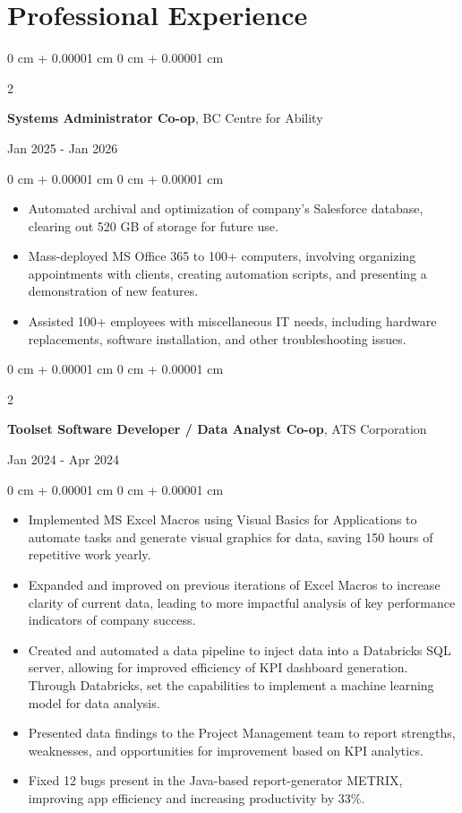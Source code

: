 \documentclass[10pt, letterpaper]{article}
\newenvironment{highlights}{
    \begin{itemize}[
        topsep=0.10 cm,
        parsep=0.10 cm,
        partopsep=0pt,
        itemsep=0pt,
        leftmargin=0 cm + 10pt
    ]
}{
    \end{itemize}
} %
\newenvironment{onecolentry}{
    \begin{adjustwidth}{
        0 cm + 0.00001 cm
    }{
        0 cm + 0.00001 cm
    }
}{
    \end{adjustwidth}
} %
\newenvironment{twocolentry}[2][]{
    \onecolentry
    \def\secondColumn{#2}
    \setcolumnwidth{\fill, 4.5 cm}
    \begin{paracol}{2}
}{
    \switchcolumn \raggedleft \secondColumn
    \end{paracol}
    \endonecolentry
} %
\begin{document}
    \section{Professional Experience}
    \begin{twocolentry}{Jan 2025 - Jan 2026}
        \textbf{Systems Administrator Co-op}, BC Centre for Ability
    \end{twocolentry}
    \vspace{0.10 cm}
    \begin{onecolentry}
        \begin{highlights}
            \item Automated archival and optimization of company's Salesforce database, clearing out 520 GB of storage for future use.
            \item Mass-deployed MS Office 365 to 100+ computers, involving organizing appointments with clients, creating automation scripts, and presenting a demonstration of new features.
            \item Assisted 100+ employees with miscellaneous IT needs, including hardware replacements, software installation, and other troubleshooting issues. 
        \end{highlights}
    \end{onecolentry}
    \vspace{0.2 cm}
    \begin{twocolentry}{Jan 2024 - Apr 2024}
        \textbf{Toolset Software Developer / Data Analyst Co-op}, ATS Corporation
    \end{twocolentry}
    \vspace{0.10 cm}
    \begin{onecolentry}
        \begin{highlights}
            \item Implemented MS Excel Macros using Visual Basics for Applications to automate tasks and generate visual graphics for data, saving 150 hours of repetitive work yearly.
            \item Expanded and improved on previous iterations of Excel Macros to increase clarity of current data, leading to more impactful analysis of key performance indicators of company success.
            \item Created and automated a data pipeline to inject data into a Databricks SQL server, allowing for improved efficiency of KPI dashboard generation. Through Databricks, set the capabilities to implement a machine learning model for data analysis.
            \item Presented data findings to the Project Management team to report strengths, weaknesses, and opportunities for improvement based on KPI analytics.
            \item Fixed 12 bugs present in the Java-based report-generator METRIX, improving app efficiency and increasing productivity by 33\%. 
        \end{highlights}
    \end{onecolentry}
\end{document}
